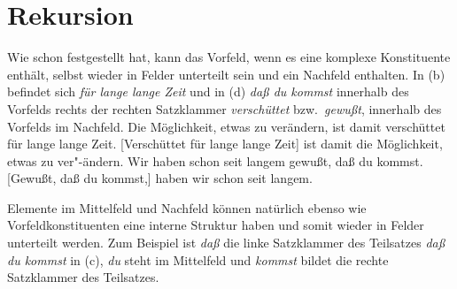 \section{Rekursion}
\label{sec-topo-rekursion}

Wie schon \citet[]{Reis80a} festgestellt hat, kann das Vorfeld,
wenn es eine komplexe Konstituente enthält, selbst wieder
in Felder unterteilt sein und \zb ein Nachfeld enthalten.
In (b) befindet sich \emph{für lange lange Zeit} und in
(d) \emph{daß du kommst} innerhalb des Vorfelds rechts der
rechten Satzklammer \emph{verschüttet} bzw.\ \emph{gewußt}, \dash
innerhalb des Vorfelds im Nachfeld.
\eal
\ex Die Möglichkeit, etwas zu verändern, ist damit verschüttet
      für lange lange Zeit.
\ex {}[Verschüttet für lange lange Zeit] ist damit die Möglichkeit, 
      etwas zu ver"-ändern.
\ex Wir haben schon seit langem gewußt, daß du kommst.
\ex {}[Gewußt, daß du kommst,] haben wir schon seit langem.
\zl

\noindent
Elemente im Mittelfeld und Nachfeld können natürlich ebenso wie
Vorfeldkonstituenten eine interne Struktur haben und somit wieder
in Felder unterteilt werden. Zum Beispiel ist \emph{daß} die linke Satzklammer des Teilsatzes
\emph{daß du kommst} in (c), \emph{du} steht im Mittelfeld und \emph{kommst} bildet die
rechte Satzklammer des Teilsatzes.%






